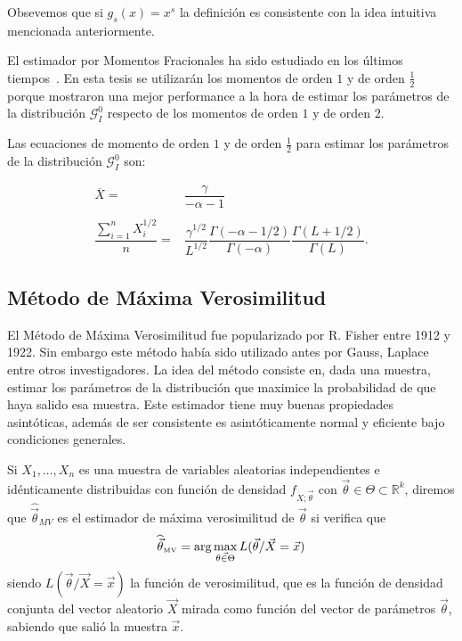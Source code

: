Obsevemos que si $g_s(x)=x^s$ la definición es consistente con la idea intuitiva mencionada anteriormente.
%

El estimador por Momentos Fracionales ha sido estudiado en los últimos tiempos~\cite{Frery97,GambiniSC08,Khan2013}. En esta tesis se utilizarán los momentos de orden $1$ y de orden $\frac{1}{2}$ porque mostraron una mejor performance a la hora de estimar los parámetros de la distribución $\mathcal G_I^0$ respecto de los momentos de orden $1$ y de orden $2$.

Las ecuaciones de momento de orden $1$ y de orden $\frac{1}{2}$ para estimar los parámetros de la distribución $\mathcal G_I^0$ son:

\begin{align}
\overline{X}=&\dfrac{\gamma}{-\alpha - 1} \\
\nonumber \\ 
\dfrac{\sum_{i=1}^n X_i^{1/2}}{n}=&\dfrac{\gamma^{1/2}}{L^{1/2}}\dfrac{\Gamma(-\alpha - 1/2)}{\Gamma(-\alpha)}\dfrac{\Gamma(L+ 1/2)}{\Gamma(L)}.
\end{align}


\subsection{Método de Máxima Verosimilitud}

 El Método de Máxima Verosimilitud fue popularizado por R. Fisher entre 1912 y 1922. Sin embargo este método había sido utilizado antes por Gauss, Laplace entre otros investigadores. La idea del método consiste en, dada una muestra, estimar los parámetros de la distribución que maximice la probabilidad de que haya salido esa muestra. Este estimador tiene muy buenas propiedades asintóticas, además de ser consistente es asintóticamente normal y eficiente bajo condiciones generales.

\begin{definition}
Si $X_1, \ldots, X_n$ es una muestra de variables aleatorias independientes e idénticamente distribuidas con función de densidad $f_{X;\vec{\theta}}$  con $\vec{\theta} \in \Theta \subset \mathbb{R}^k$, diremos que $\widehat{\vec{\theta}}_{MV}$ es el estimador de máxima verosimilitud de $\vec{\theta}$ si verifica que 
\begin{align}
\widehat{\vec{\theta}}_{{\text{\tiny{MV}}}}=\arg\max_{\vec{\theta \in \Theta}} L(\vec{\theta}/\vec{X}=\vec{x})
\end{align}
siendo $L(\vec{\theta}/\vec{X}=\vec{x})$ la función de verosimilitud, que es la función de densidad conjunta del vector aleatorio $\vec{X}$ mirada como función del vector de parámetros $\vec{\theta}$, sabiendo que salió la muestra $\vec{x}$.
\end{definition}

